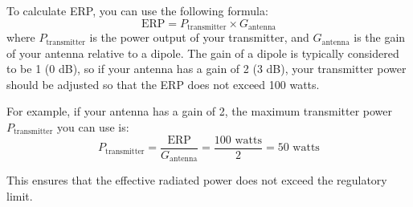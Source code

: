 To calculate ERP, you can use the following formula:
\[
\text{ERP} = P_{\text{transmitter}} \times G_{\text{antenna}}
\]
where \( P_{\text{transmitter}} \) is the power output of your transmitter, and \( G_{\text{antenna}} \) is the gain of your antenna relative to a dipole. The gain of a dipole is typically considered to be 1 (0 dB), so if your antenna has a gain of 2 (3 dB), your transmitter power should be adjusted so that the ERP does not exceed 100 watts.

For example, if your antenna has a gain of 2, the maximum transmitter power \( P_{\text{transmitter}} \) you can use is:
\[
P_{\text{transmitter}} = \frac{\text{ERP}}{G_{\text{antenna}}} = \frac{100 \text{ watts}}{2} = 50 \text{ watts}
\]

This ensures that the effective radiated power does not exceed the regulatory limit.

